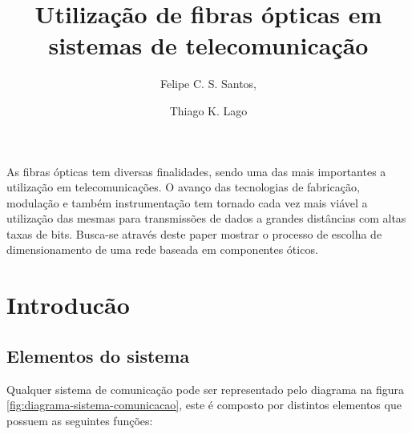 \documentclass[article]{IEEEtran}
\begin{document}
%
\title{Utilização de fibras ópticas em sistemas de telecomunicação}




\author{
	Felipe C. S. Santos,
	\and
	Thiago K. Lago
	
}






\maketitle

\IEEEdisplaynontitleabstractindextext
As fibras ópticas tem diversas finalidades, sendo uma das mais importantes a utilização em telecomunicações. O avanço das tecnologias de fabricação, modulação e também instrumentação tem tornado cada vez mais viável a utilização das mesmas para transmissões de dados a grandes distâncias com altas taxas de bits. Busca-se através deste paper mostrar o processo de escolha de dimensionamento de uma rede baseada em componentes óticos.
\IEEEpeerreviewmaketitle



\section{Introducão}
\subsection{Elementos do sistema}
\par Qualquer sistema de comunicação pode ser representado pelo diagrama na figura \ref{fig:diagrama-sistema-comunicacao}, este é composto por distintos elementos que possuem as seguintes funções: 
\end{document}
